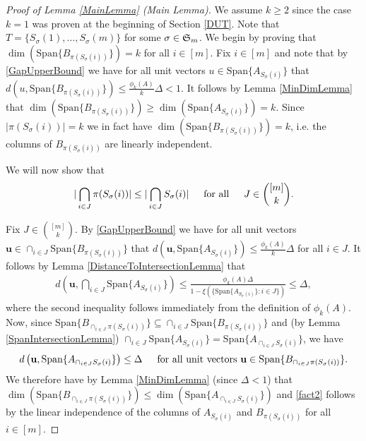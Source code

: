 \documentclass[journal, onecolumn]{IEEEtran}
\begin{document}
\begin{proof}[Proof of Lemma \ref{MainLemma} (Main Lemma)]
We assume $k \geq 2$ since the case $k = 1$ was proven at the beginning of Section \ref{DUT}. Note that $T = \{S_\sigma(1), \ldots, S_\sigma(m)\}$ for some $\sigma \in \frak{S}_m$. We begin by proving that $\dim(\text{Span}\{B_{\pi(S_\sigma(i))}\}) = k$ for all $i \in [m]$. Fix $i \in [m]$ and note that by \eqref{GapUpperBound} we have for all unit vectors $u \in \text{Span}\{A_{S_\sigma(i)}\}$ that $d(u, \text{Span}\{B_{\pi(S_\sigma(i))}\}) \leq \frac{\phi_k(A)}{k} \Delta < 1$. It follows by Lemma \ref{MinDimLemma} that $\dim(\text{Span}\{B_{\pi(S_\sigma(i))}\}) \geq \dim(\text{Span}\{A_{S_\sigma(i)}\}) = k$. Since $|\pi(S_\sigma(i))| = k$ we in fact have $\dim(\text{Span}\{B_{\pi(S_\sigma(i))}\}) = k$, i.e. the columns of $B_{\pi(S_\sigma(i))}$ are linearly independent. 

We will now show that
\begin{align}\label{fact2}
|\bigcap_{i \in J} \pi(S_\sigma(i))| \leq |\bigcap_{i \in J} S_\sigma(i) | \indent \text{for all} \indent J \in {[m] \choose k}.
\end{align}

Fix $J \in {[m] \choose k}$. By \eqref{GapUpperBound} we have for all unit vectors $\mathbf{u} \in \cap_{i \in J} \text{Span}\{B_{\pi(S_\sigma(i))}\}$ that $d(\mathbf{u}, \text{Span}\{A_{S_\sigma(i)}\}) \leq \frac{\phi_k(A)}{k} \Delta$ for all $i \in J$. It follows by Lemma \ref{DistanceToIntersectionLemma} that
\begin{align*}
d\left( \mathbf{u}, \bigcap_{i \in J} \text{Span}\{A_{S_{\sigma}(i)}\} \right) 
\leq \frac{ \phi_k(A) \Delta  }{1 - \xi( \{ \text{Span}\{A_{S_{\sigma}(i)}\}: i \in J\} ) } \leq \Delta,
\end{align*}
%
where the second inequality follows immediately from the definition of $\phi_k(A)$. Now, since $\text{Span}\{B_{\cap_{i \in J}\pi(S_\sigma(i))}\} \subseteq \cap_{i \in J} \text{Span}\{B_{\pi(S_\sigma(i))}\}$ and (by Lemma \ref{SpanIntersectionLemma}) $\cap_{i \in J}  \text{Span}\{A_{S_\sigma(i)}\} = \text{Span}\{A_{\cap_{i \in J}  S_\sigma(i)}\}$, we have
\begin{align}\label{fact1}
d\left( \mathbf{u}, \text{Span}\{A_{\cap_{i \in J} S_\sigma(i)}\} \right) \leq \Delta \indent \text{for all unit vectors } \mathbf{u} \in \text{Span}\{B_{\cap_{i \in J}\pi(S_\sigma(i))}\}.
\end{align}
We therefore have by Lemma \ref{MinDimLemma} (since $\Delta < 1$) that $\dim(\text{Span}\{B_{\cap_{i \in J}\pi(S_\sigma(i))}\}) \leq \dim(\text{Span}\{A_{\cap_{i \in J} S_\sigma(i)}\})$ and \eqref{fact2} follows by the linear independence of the columns of $A_{S_\sigma(i)}$ and $B_{\pi(S_\sigma(i))}$ for all $i \in [m]$.


\end{proof}
\end{document}

